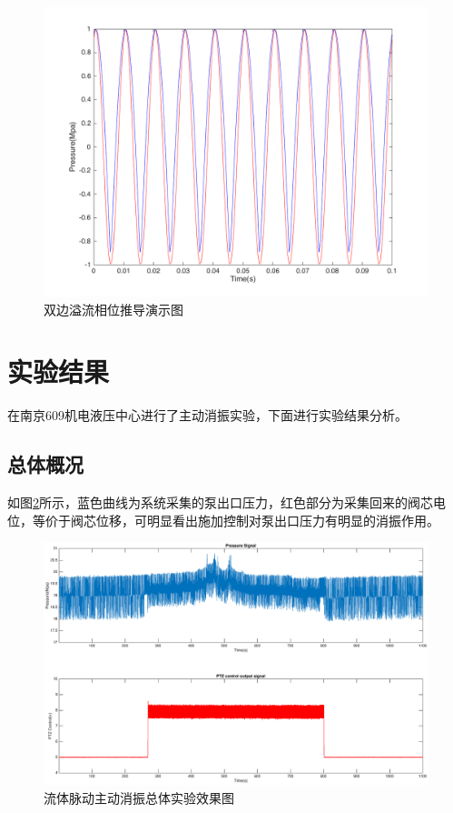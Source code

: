 \documentclass[12pt]{article}
\begin{document}
\begin{figure}[H]
\begin{center}
\includegraphics[width=0.9\linewidth]{./images/双边溢流相位推导演示图.png}
\caption{双边溢流相位推导演示图}
\label{fig:fig6}
\end{center}
\end{figure}

\section{实验结果}
在南京609机电液压中心进行了主动消振实验，下面进行实验结果分析。

\subsection{总体概况}
如图\ref{fig:fig7}所示，蓝色曲线为系统采集的泵出口压力，红色部分为采集回来的阀芯电位，等价于阀芯位移，可明显看出施加控制对泵出口压力有明显的消振作用。
\begin{figure}[H]
\begin{center}
\includegraphics[width=0.9\linewidth]{./images/time_domain_overall.eps}
\caption{流体脉动主动消振总体实验效果图}
\label{fig:fig7}
\end{center}
\end{figure}
\end{document}
